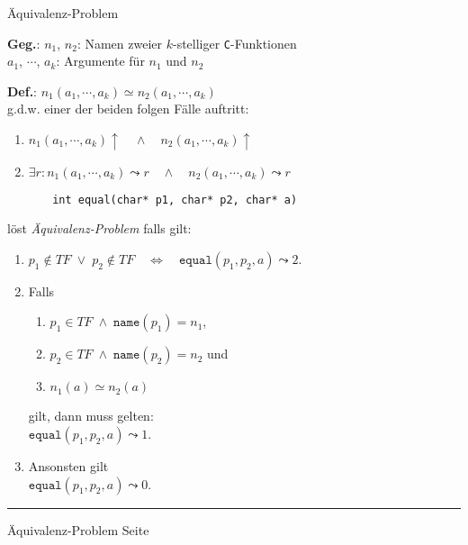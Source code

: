 \documentclass{slides}
\newcounter{mypage}
\begin{document}
\begin{slide}{}
\normalsize

\begin{center}
Äquivalenz-Problem
\end{center}
\vspace*{0.5cm}

\footnotesize
\textbf{Geg.}: $n_1$, $n_2$: Namen zweier $k$-stelliger \texttt{C}-Funktionen \\[0.1cm]
\hspace*{1.8cm} $a_1$, $\cdots$, $a_k$: Argumente f\"ur $n_1$ und $n_2$

\textbf{Def.}: $n_1(a_1,\cdots,a_k) \simeq n_2(a_1,\cdots,a_k)$ \\[0.1cm]
g.d.w. einer der beiden folgen F\"alle auftritt:
\begin{enumerate}
\item $n_1(a_1,\cdots,a_k)\uparrow \quad\wedge\quad n_2(a_1,\cdots,a_k)\uparrow$
\item $\exists r: n_1(a_1,\cdots,a_k) \leadsto r \quad\wedge\quad n_2(a_1,\cdots,a_k) \leadsto r$
\end{enumerate}

\begin{verbatim}
       int equal(char* p1, char* p2, char* a)
\end{verbatim}
l\"ost \emph{Äquivalenz-Problem} falls gilt:
\begin{enumerate}
\item $p_1 \not\in T\!F \;\vee\; p_2 \not\in T\!F \quad\Leftrightarrow\quad \mathtt{equal}(p_1, p_2, a) \leadsto 2$.
\item Falls 
  \begin{enumerate}
  \item $p_1 \in T\!F \;\wedge\; \mathtt{name}(p_1) = n_1$,
  \item $p_2 \in T\!F \;\wedge\; \mathtt{name}(p_2) = n_2$ \quad und
  \item $n_1(a) \simeq n_2(a)$
  \end{enumerate}
    gilt, dann muss gelten: \\[0.1cm]
   \hspace*{1.3cm}  $\mathtt{equal}(p_1, p_2, a) \leadsto 1$.
\item Ansonsten gilt \\[0.1cm]
      \hspace*{1.3cm} $\mathtt{equal}(p_1, p_2, a) \leadsto 0$.
\end{enumerate}


\vspace*{\fill}
\tiny \addtocounter{mypage}{1}
\rule{17cm}{1mm}
Äquivalenz-Problem  \hspace*{\fill} Seite 
\end{slide}
\end{document}
